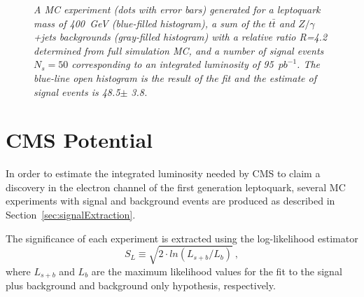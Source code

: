 \documentclass{cmspaper}
\begin{document}
\begin{linenumbers}
 \begin{figure}[htb]
   \begin{center}
     \caption{\small \sl A MC experiment (dots with error bars) generated for a leptoquark mass of 
       400~GeV (blue-filled histogram), a sum of the $t\bar{t}$ and $Z/\gamma$+jets 
       backgrounds (gray-filled histogram) with a relative ratio R=4.2 determined from 
       full simulation MC, and a number of signal events $N_s=50$ corresponding
       to an integrated luminosity of 95~$pb^{-1}$.
       The blue-line open histogram is the result of the fit and the estimate of signal 
       events is 48.5$\pm$ 3.8.}
     \label{fig:Mej_fit}
   \end{center}
 \end{figure}



\section{CMS Potential} \label{CMSpotential}

In order to estimate the integrated luminosity needed by CMS to claim 
a discovery in the electron channel of the first generation leptoquark, 
several MC experiments with signal and background events are produced
as described in Section~\ref{sec:signalExtraction}.

The significance of each experiment is extracted using the log-likelihood estimator 
\begin{displaymath}
S_L \equiv \sqrt{2\cdot ln{(L_{s+b}/L_{b})}}~\mathrm{,}
\end{displaymath}
where $L_{s+b}$ and $L_b$ are the maximum likelihood values for the fit to
the signal plus background and background only hypothesis, respectively.


\end{linenumbers}
\end{document}
